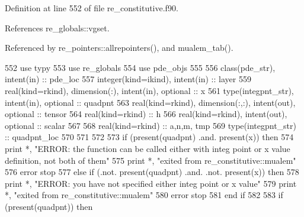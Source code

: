 Definition at line 552 of file re\+\_\+constitutive.\+f90.



References re\+\_\+globals\+::vgset.



Referenced by re\+\_\+pointers\+::allrepointers(), and mualem\+\_\+tab().


\begin{DoxyCode}
552       \textcolor{keywordtype}{use }typy
553       \textcolor{keywordtype}{use }re_globals
554       \textcolor{keywordtype}{use }pde_objs
555 
556       \textcolor{keywordtype}{class}(pde_str), \textcolor{keywordtype}{intent(in)} :: pde\_loc
557       \textcolor{keywordtype}{integer(kind=ikind)}, \textcolor{keywordtype}{intent(in)} :: layer
559       \textcolor{keywordtype}{real(kind=rkind)}, \textcolor{keywordtype}{dimension(:)}, \textcolor{keywordtype}{intent(in)}, \textcolor{keywordtype}{optional} :: x
561       \textcolor{keywordtype}{type}(integpnt_str), \textcolor{keywordtype}{intent(in)}, \textcolor{keywordtype}{optional} :: quadpnt      
563       \textcolor{keywordtype}{real(kind=rkind)}, \textcolor{keywordtype}{dimension(:,:)}, \textcolor{keywordtype}{intent(out)}, \textcolor{keywordtype}{optional} :: tensor
564       \textcolor{keywordtype}{real(kind=rkind)} :: h
566       \textcolor{keywordtype}{real(kind=rkind)}, \textcolor{keywordtype}{intent(out)}, \textcolor{keywordtype}{optional} :: scalar
567 
568       \textcolor{keywordtype}{real(kind=rkind)} :: a,n,m, tmp
569       \textcolor{keywordtype}{type}(integpnt_str) :: quadpnt\_loc
570       
571   
572 
573       \textcolor{keywordflow}{if} (\textcolor{keyword}{present}(quadpnt) .and. \textcolor{keyword}{present}(x)) \textcolor{keywordflow}{then}
574         print *, \textcolor{stringliteral}{"ERROR: the function can be called either with integ point or x value definition, not both
       of them"}
575         print *, \textcolor{stringliteral}{"exited from re\_constitutive::mualem"}
576         error stop
577       \textcolor{keywordflow}{else} \textcolor{keywordflow}{if} (.not. \textcolor{keyword}{present}(quadpnt) .and. .not. \textcolor{keyword}{present}(x)) \textcolor{keywordflow}{then}
578         print *, \textcolor{stringliteral}{"ERROR: you have not specified either integ point or x value"}
579         print *, \textcolor{stringliteral}{"exited from re\_constitutive::mualem"}
580         error stop
581 \textcolor{keywordflow}{      end if}
582       
583       \textcolor{keywordflow}{if} (\textcolor{keyword}{present}(quadpnt)) \textcolor{keywordflow}{then}

\end{DoxyCode}
